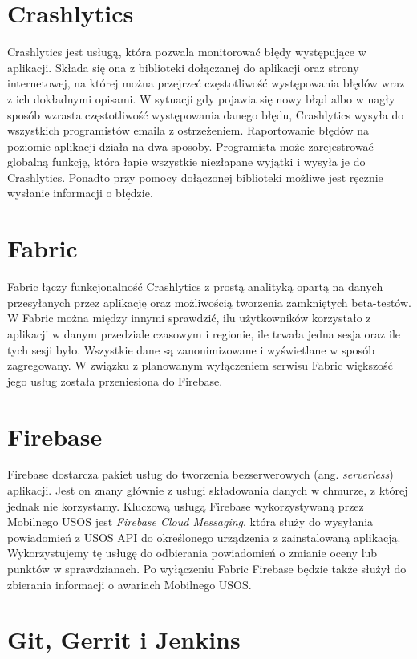 \documentclass{pracamgr}
\begin{document}
\section{Crashlytics}

Crashlytics jest usługą, która pozwala monitorować błędy występujące w aplikacji.
Składa się ona z biblioteki dołączanej do aplikacji oraz strony internetowej,
na której można przejrzeć częstotliwość występowania błędów wraz z ich dokładnymi
opisami. W sytuacji gdy pojawia się nowy błąd albo w nagły sposób wzrasta częstotliwość
występowania danego błędu, Crashlytics wysyła do wszystkich programistów emaila
z ostrzeżeniem. Raportowanie błędów na poziomie aplikacji działa na dwa sposoby.
Programista może zarejestrować globalną funkcję, która łapie wszystkie niezłapane
wyjątki i wysyła je do Crashlytics. Ponadto przy pomocy dołączonej biblioteki
możliwe jest ręcznie wysłanie informacji o błędzie.

\section{Fabric}

Fabric łączy funkcjonalność Crashlytics z prostą analityką opartą na danych przesyłanych
przez aplikację oraz możliwością tworzenia zamkniętych beta-testów. W Fabric można
między innymi sprawdzić, ilu użytkowników korzystało z aplikacji w danym przedziale
czasowym i regionie, ile trwała jedna sesja oraz ile tych sesji było. Wszystkie
dane są zanonimizowane i wyświetlane w sposób zagregowany. W związku z planowanym
wyłączeniem serwisu Fabric większość jego usług została przeniesiona do Firebase.

\section{Firebase}

Firebase dostarcza pakiet usług do tworzenia bezserwerowych (ang.
\textit{serverless}) aplikacji. Jest on znany głównie z usługi składowania
danych w chmurze, z której jednak nie korzystamy. Kluczową usługą Firebase
wykorzystywaną przez Mobilnego USOS jest \textit{Firebase Cloud Messaging},
która służy do wysyłania powiadomień z USOS API do określonego urządzenia z
zainstalowaną aplikacją. Wykorzystujemy tę usługę do odbierania powiadomień o
zmianie oceny lub punktów w sprawdzianach. Po wyłączeniu Fabric Firebase będzie
także służył do zbierania informacji o awariach Mobilnego USOS.

\section{Git, Gerrit i Jenkins}
\end{document}
